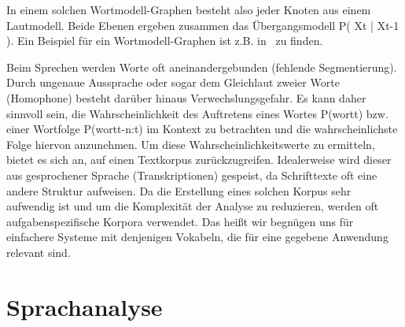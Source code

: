 In einem solchen Wortmodell-Graphen besteht also jeder Knoten aus einem Lautmodell.
Beide Ebenen ergeben zusammen das Übergangsmodell P( Xt | Xt-1 ).
Ein Beispiel für ein Wortmodell-Graphen ist z.B. in~\cite[S. 1058]{russelnorvig} zu finden.

Beim Sprechen werden Worte oft aneinandergebunden (fehlende Segmentierung).
Durch ungenaue Aussprache oder sogar dem Gleichlaut zweier Worte (Homophone) besteht darüber hinaus Verwechslungsgefahr.
Es kann daher sinnvoll sein, die Wahrscheinlichkeit des Auftretens eines Wortes P(wortt) bzw.
einer Wortfolge P(wortt-n:t) im Kontext zu betrachten und die wahrscheinlichste Folge hiervon anzunehmen.
Um diese Wahrscheinlichkeitswerte zu ermitteln, bietet es sich an, auf einen Textkorpus zurückzugreifen.
Idealerweise wird dieser aus gesprochener Sprache (Transkriptionen) gespeist, da Schrifttexte oft eine andere Struktur aufweisen.
Da die Erstellung eines solchen Korpus sehr aufwendig ist und um die Komplexität der Analyse zu reduzieren, werden oft aufgabenspezifische Korpora verwendet.
Das heißt wir begnügen uns für einfachere Systeme mit denjenigen Vokabeln, die für eine gegebene Anwendung relevant sind.

\section{Sprachanalyse}
